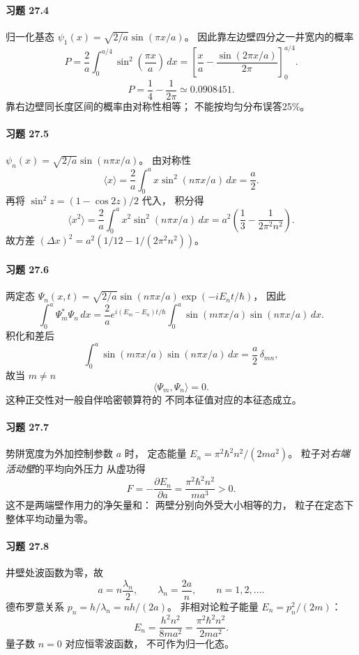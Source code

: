 \paragraph{习题 27.4}
归一化基态
\(\psi_1(x)=\sqrt{2/a}\sin(\pi x/a)\)。
因此靠左边壁四分之一井宽内的概率
\[
P=\frac2a\int_0^{a/4}\sin^2\left(\frac{\pi x}a\right)\,dx
=\left[\frac xa-\frac{\sin(2\pi x/a)}{2\pi}
\right]_{0}^{a/4}.
\]
\[
\boxed{P=\frac14-\frac1{2\pi}
\simeq0.0908451}.
\]
靠右边壁同长度区间的概率由对称性相等；
不能按均匀分布误答25\%。

\paragraph{习题 27.5}
\(\psi_n(x)=\sqrt{2/a}\sin(n\pi x/a)\)。
由对称性
\[
\boxed{\langle x\rangle
=\frac2a\int_0^a x\sin^2(n\pi x/a)\,dx
=\frac a2}.
\]
再将 \(\sin^2z=(1-\cos2z)/2\) 代入，
积分得
\[
\boxed{\langle x^2\rangle
=\frac2a\int_0^a x^2\sin^2(n\pi x/a)\,dx
=a^2\left(\frac13-\frac1{2\pi^2n^2}\right)}.
\]
故方差
\(\boxed{(\Delta x)^2
=a^2(1/12-1/(2\pi^2n^2))}\)。

\paragraph{习题 27.6}
两定态
\(\Psi_n(x,t)=\sqrt{2/a}\sin(n\pi x/a)
\exp(-iE_nt/\hbar)\)，
因此
\[
\int_0^a\Psi_m^*\Psi_n\,dx
=\frac2a e^{i(E_m-E_n)t/\hbar}
\int_0^a\sin(m\pi x/a)\sin(n\pi x/a)\,dx.
\]
积化和差后
\[
\int_0^a\sin(m\pi x/a)\sin(n\pi x/a)\,dx
=\frac a2\,\delta_{mn},
\]
故当 \(m\ne n\)
\[
\boxed{\langle\Psi_m,\Psi_n\rangle=0}.
\]
这种正交性对一般自伴哈密顿算符的
不同本征值对应的本征态成立。

\paragraph{习题 27.7}
势阱宽度为外加控制参数 \(a\) 时，
定态能量
\(E_n=\pi^2\hbar^2n^2/(2ma^2)\)。
粒子对\emph{右端活动壁}的平均向外压力
从虚功得
\[
\boxed{F=-\frac{\partial E_n}{\partial a}
=\frac{\pi^2\hbar^2n^2}{ma^3}>0}.
\]
这不是两端壁作用力的净矢量和：
两壁分别向外受大小相等的力，
粒子在定态下整体平均动量为零。

\paragraph{习题 27.8}
井壁处波函数为零，故
\[
a=n\frac{\lambda_n}{2},\qquad
\lambda_n=\frac{2a}{n},\qquad n=1,2,\ldots.
\]
德布罗意关系 \(p_n=h/\lambda_n=nh/(2a)\)。
非相对论粒子能量 \(E_n=p_n^2/(2m)\)：
\[
\boxed{E_n=\frac{h^2n^2}{8ma^2}
=\frac{\pi^2\hbar^2n^2}{2ma^2}}.
\]
量子数 \(n=0\) 对应恒零波函数，
不可作为归一化态。


